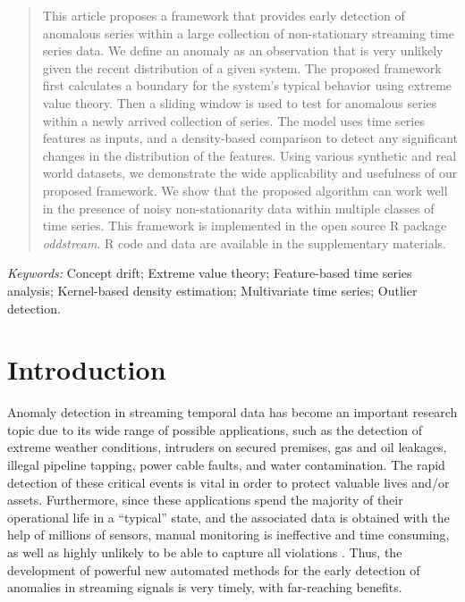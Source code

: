 \documentclass[12pt]{article}
\begin{document}
\bigskip
\begin{abstract}
This article proposes a framework that provides early detection of
anomalous series within a large collection of non-stationary streaming
time series data. We define an anomaly as an observation that is very
unlikely given the recent distribution of a given system. The proposed
framework first calculates a boundary for the system's typical behavior
using extreme value theory. Then a sliding window is used to test for
anomalous series within a newly arrived collection of series. The model
uses time series features as inputs, and a density-based comparison to
detect any significant changes in the distribution of the features.
Using various synthetic and real world datasets, we demonstrate the wide
applicability and usefulness of our proposed framework. We show that the
proposed algorithm can work well in the presence of noisy
non-stationarity data within multiple classes of time series. This
framework is implemented in the open source R package \emph{oddstream}.
R code and data are available in the supplementary materials.
\end{abstract}

\noindent%
{\it Keywords:} Concept drift; Extreme value theory; Feature-based time series analysis;
Kernel-based density estimation; Multivariate time series; Outlier
detection.
\vfill

\newpage
{} %

\hypertarget{introduction}{%
\section{Introduction}\label{introduction}}

\label{sec:intro}

Anomaly detection in streaming temporal data has become an important
research topic due to its wide range of possible applications, such as
the detection of extreme weather conditions, intruders on secured
premises, gas and oil leakages, illegal pipeline tapping, power cable
faults, and water contamination. The rapid detection of these critical
events is vital in order to protect valuable lives and/or assets.
Furthermore, since these applications spend the majority of their
operational life in a ``typical'' state, and the associated data is
obtained with the help of millions of sensors, manual monitoring is
ineffective and time consuming, as well as highly unlikely to be able to
capture all violations \citep{lavin2015evaluating}. Thus, the
development of powerful new automated methods for the early detection of
anomalies in streaming signals is very timely, with far-reaching
benefits.
\end{document}
